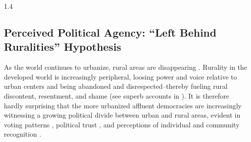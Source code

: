 \documentclass[10pt, letterpaper]{article}
\begin{document}
\begin{spacing}{1.4}
\subsection{Perceived Political Agency: ``Left Behind Ruralities'' Hypothesis}

 
As the world continues to urbanize, rural areas are disappearing 
 \citep{pospvech2024loss}. Rurality in the developed world is increasingly
 peripheral, loosing power and voice relative to urban centers and being
 abandoned and disrespected--thereby fueling rural discontent, resentment, and shame (see superb accounts in 
 \citet{hansonCityJournalautumn15,fullerNYT17monD}). %
  It is therefore hardly surprising that the more urbanized affluent democracies
  are increasingly witnessing a growing political divide between urban and rural
  areas, evident in voting patterns
  \citep{huijsmans2025great,mettler2022growing}, political trust
  \citep{mitsch2021faith}, and perceptions of individual
  and community recognition \citep{hyland2024feeling}. 
 


\end{spacing}
\end{document}
